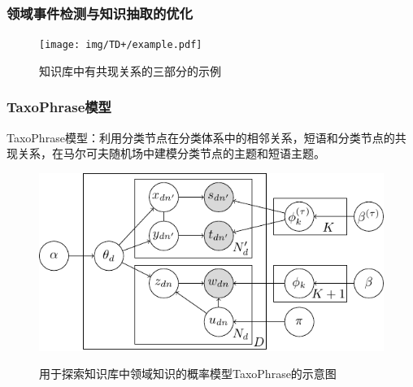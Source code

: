 \begin{frame}
\frametitle{\noindent 领域事件检测与知识抽取的优化}	
\vspace{-5mm}
\begin{figure}
	\setlength{\abovecaptionskip}{0.cm}
	\setlength{\belowcaptionskip}{0.cm}
	\caption{知识库中有共现关系的三部分的示例}
    \texttt{[image: img/TD+/example.pdf]}
\end{figure}
\end{frame}

\begin{frame}
\frametitle{\noindent TaxoPhrase模型}
TaxoPhrase模型：利用分类节点在分类体系中的相邻关系，短语和分类节点的共现关系，在马尔可夫随机场中建模分类节点的主题和短语主题。
\vspace{-0.5cm}
\begin{figure}
	\centering
	\caption{用于探索知识库中领域知识的概率模型TaxoPhrase的示意图}
    \includegraphics[width=0.8\columnwidth]{img/TD+/TaxoPhrase_inpaper.pdf}
	\label{fig:IllustrationTaxoPhrase}
\end{figure}
\end{frame}

